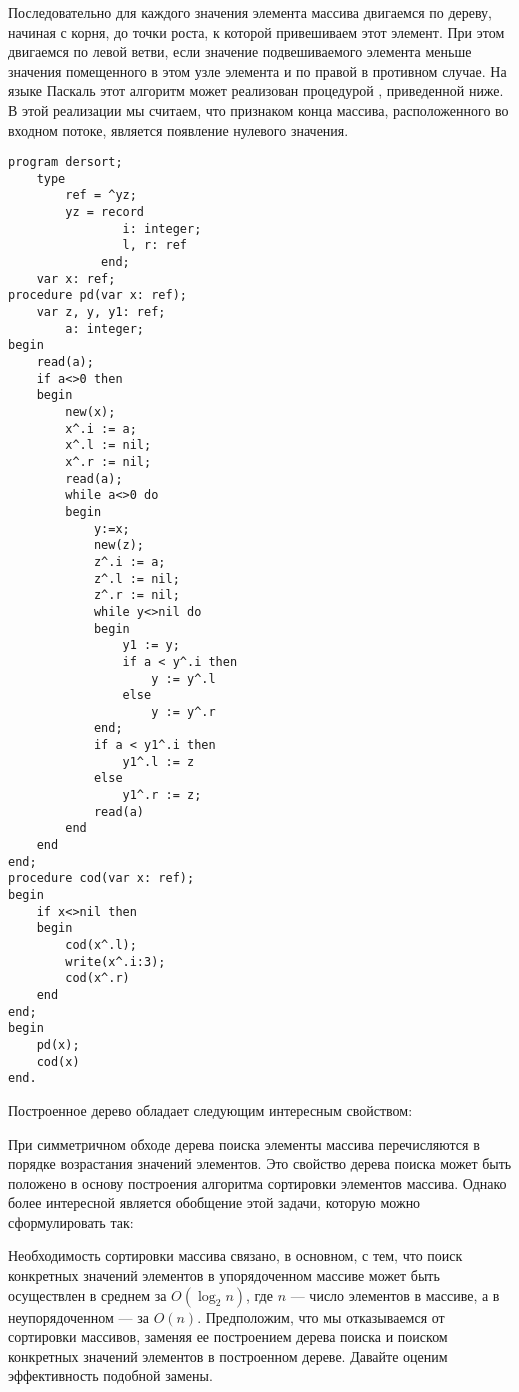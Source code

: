 \documentclass[12pt,a4paper]{article}
\theoremstyle{plain}
\theoremstyle{definition}
\theoremstyle{remark}
\begin{document}
Последовательно для каждого значения элемента массива двигаемся по дереву, начиная с корня, до точки роста, к которой привешиваем этот элемент. При этом двигаемся по левой ветви, если значение подвешиваемого элемента меньше значения помещенного в этом узле элемента и по правой в противном случае. На языке Паскаль этот алгоритм может реализован процедурой \verb@pd@, приведенной ниже. В этой реализации мы считаем, что признаком конца массива, расположенного во входном потоке, является появление нулевого значения.

\begin{verbatim}
program dersort;
    type
        ref = ^yz;
        yz = record
                i: integer;
                l, r: ref
             end;
    var x: ref;
procedure pd(var x: ref);
    var z, y, y1: ref;
        a: integer;
begin
    read(a);
    if a<>0 then
    begin
        new(x);
        x^.i := a;
        x^.l := nil;
        x^.r := nil;
        read(a);
        while a<>0 do
        begin
            y:=x;
            new(z);
            z^.i := a;
            z^.l := nil;
            z^.r := nil;
            while y<>nil do
            begin
                y1 := y;
                if a < y^.i then
                    y := y^.l
                else 
                    y := y^.r
            end;
            if a < y1^.i then
                y1^.l := z
            else
                y1^.r := z;
            read(a)
        end
    end
end;
procedure cod(var x: ref);
begin
    if x<>nil then
    begin
        cod(x^.l);
        write(x^.i:3);
        cod(x^.r)
    end
end;
begin
    pd(x);
    cod(x)
end.
\end{verbatim}

Построенное дерево обладает следующим интересным свойством: 

При симметричном обходе дерева поиска элементы массива перечисляются в порядке возрастания значений элементов. Это свойство дерева поиска может быть положено в основу построения алгоритма сортировки элементов массива. Однако более интересной является обобщение этой задачи, которую можно сформулировать так:

Необходимость сортировки массива связано, в основном, с тем, что поиск конкретных значений элементов в упорядоченном массиве может быть осуществлен в среднем за $O(\log_2 n)$, где $n$ --- число элементов в массиве, а в неупорядоченном --- за $O(n)$. Предположим, что мы отказываемся от сортировки массивов, заменяя ее построением дерева поиска и поиском конкретных значений элементов в построенном дереве. Давайте оценим эффективность подобной замены.
\end{document}
